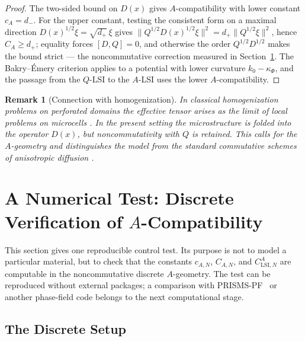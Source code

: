 \documentclass{article}
\newtheorem{remark}[theorem]{Remark}
\begin{document}
\begin{proof}
The two-sided bound on \(D(x)\) gives \(A\)-compatibility with lower constant
\(c_A=d_-\). For the upper constant, testing the consistent form on a maximal
direction \(D(x)^{1/2}\xi=\sqrt{d_+}\,\xi\) gives
\(\|Q^{1/2}D(x)^{1/2}\xi\|^2=d_+\|Q^{1/2}\xi\|^2\), hence \(C_A\ge d_+\); equality
forces \([D,Q]=0\), and otherwise the order \(Q^{1/2}D^{1/2}\) makes the bound
strict --- the noncommutative correction measured in
Section~\ref{sec:computational-verification}. The Bakry--Émery
criterion \cite{BakryGentilLedoux} applies to a potential with lower curvature \(k_0-\kappa_\Phi\), and the
passage from the \(Q\)-LSI to the \(A\)-LSI uses the lower \(A\)-compatibility.
\end{proof}

\begin{remark}[Connection with homogenization]
In classical homogenization problems on perforated domains the effective tensor
arises as the limit of local problems on microcells
\cite{Allaire,CioranescuDonato}. In the present setting the microstructure is
folded into the operator \(D(x)\), but noncommutativity with \(Q\) is retained.
This calls for the \(A\)-geometry and distinguishes the model from the standard
commutative schemes of anisotropic diffusion \cite{Weickert}.
\end{remark}



\section{A Numerical Test: Discrete Verification of \(A\)-Compatibility}
\label{sec:computational-verification}

This section gives one reproducible control test. Its purpose is not to model a
particular material, but to check that the constants \(c_{A,N}\), \(C_{A,N}\), and
\(C_{\mathrm{LSI},N}^A\) are computable in the noncommutative discrete
\(A\)-geometry. The test can be reproduced without external packages; a comparison
with PRISMS-PF~\cite{DeWitt2020} or another phase-field code belongs to the next computational
stage.

\subsection{The Discrete Setup}
\end{document}
